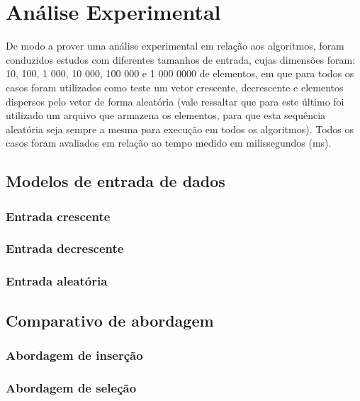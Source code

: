 \documentclass[conference]{IEEEtran}
\begin{document}
\section{Análise Experimental}
De modo a prover uma análise experimental em relação aos algoritmos, foram conduzidos estudos com diferentes tamanhos de entrada, cujas dimensões foram: 10, 100, 1 000, 10 000, 100 000 e 1 000 0000 de elementos, em que para todos os casos foram utilizados como teste um vetor crescente, decrescente e elementos dispersos pelo vetor de forma aleatória (vale ressaltar que para este último foi utilizado um arquivo que armazena os elementos, para que esta sequência aleatória seja sempre a mesma para execução em todos os algoritmos). Todos os casos foram avaliados em relação ao tempo medido em milissegundos (ms).



\subsection{Modelos de entrada de dados}

\subsubsection{Entrada crescente}


\subsubsection{Entrada decrescente}


\subsubsection{Entrada aleatória}


\subsection{Comparativo de abordagem}

\subsubsection{Abordagem de inserção}


\subsubsection{Abordagem de seleção}
\end{document}
